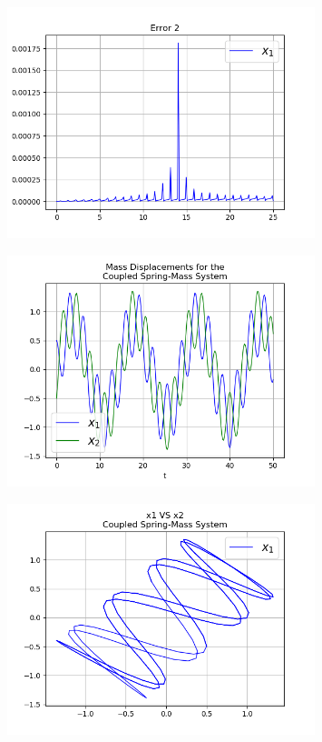 \documentclass{article}
\begin{document}
\begin{figure}[!ht]
\centering
\includegraphics[width=0.8\textwidth]{two_springs2-E2}
\end{figure}
\begin{figure}[!ht]
\centering
\includegraphics[width=0.8\textwidth]{two_springs3-1}
\end{figure}
\begin{figure}[!ht]
\centering
\includegraphics[width=0.8\textwidth]{two_springs3-2}
\end{figure}
\end{document}
